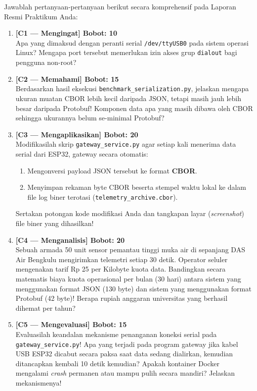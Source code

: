 \documentclass[11pt,a4paper]{article}
\begin{document}
Jawablah pertanyaan-pertanyaan berikut secara komprehensif pada Laporan Resmi Praktikum Anda:

\begin{enumerate}
    \item \textbf{[C1 --- Mengingat] Bobot: 10}\\
    Apa yang dimaksud dengan peranti serial \texttt{/dev/ttyUSB0} pada sistem operasi Linux? Mengapa port tersebut memerlukan izin akses grup \texttt{dialout} bagi pengguna non-root?

    \item \textbf{[C2 --- Memahami] Bobot: 15}\\
    Berdasarkan hasil eksekusi \texttt{benchmark\_serialization.py}, jelaskan mengapa ukuran muatan CBOR lebih kecil daripada JSON, tetapi masih jauh lebih besar daripada Protobuf! Komponen data apa yang masih dibawa oleh CBOR sehingga ukurannya belum se-minimal Protobuf?

    \item \textbf{[C3 --- Mengaplikasikan] Bobot: 20}\\
    Modifikasilah skrip \texttt{gateway\_service.py} agar setiap kali menerima data serial dari ESP32, gateway secara otomatis:
    \begin{enumerate}[label=(\alph*)]
        \item Mengonversi payload JSON tersebut ke format \textbf{CBOR}.
        \item Menyimpan rekaman byte CBOR beserta stempel waktu lokal ke dalam file log biner terotasi (\texttt{telemetry\_archive.cbor}).
    \end{enumerate}
    Sertakan potongan kode modifikasi Anda dan tangkapan layar (\textit{screenshot}) file biner yang dihasilkan!

    \item \textbf{[C4 --- Menganalisis] Bobot: 20}\\
    Sebuah armada 50 unit sensor pemantau tinggi muka air di sepanjang DAS Air Bengkulu mengirimkan telemetri setiap 30 detik. Operator seluler mengenakan tarif Rp 25 per Kilobyte kuota data. Bandingkan secara matematis biaya kuota operasional per bulan (30 hari) antara sistem yang menggunakan format JSON (130 byte) dan sistem yang menggunakan format Protobuf (42 byte)! Berapa rupiah anggaran universitas yang berhasil dihemat per tahun?

    \item \textbf{[C5 --- Mengevaluasi] Bobot: 15}\\
    Evaluasilah keandalan mekanisme penanganan koneksi serial pada \texttt{gateway\_service.py}! Apa yang terjadi pada program gateway jika kabel USB ESP32 dicabut secara paksa saat data sedang dialirkan, kemudian ditancapkan kembali 10 detik kemudian? Apakah kontainer Docker mengalami \textit{crash} permanen atau mampu pulih secara mandiri? Jelaskan mekanismenya!


\end{enumerate}
\end{document}
